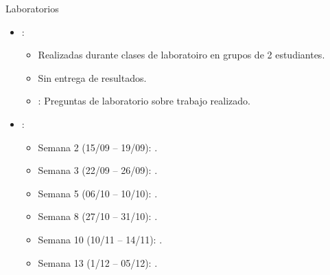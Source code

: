 \begin{frame}[t]{Laboratorios}
\begin{itemize}
  \item {}:
    \begin{itemize}
      \item Realizadas durante clases de laboratoiro en grupos de 2 estudiantes.
      \item Sin entrega de resultados.
      \item {}: Preguntas de laboratorio sobre trabajo realizado.
    \end{itemize}

  \item {}:
    \begin{itemize}
      \item Semana 2 (15/09 -- 19/09): .
      \item Semana 3 (22/09 -- 26/09): .
      \item Semana 5 (06/10 -- 10/10): .
      \item Semana 8 (27/10 -- 31/10): .
      \item Semana 10 (10/11 -- 14/11): .
      \item Semana 13 (1/12 -- 05/12): .
    \end{itemize}
\end{itemize}
\end{frame}

